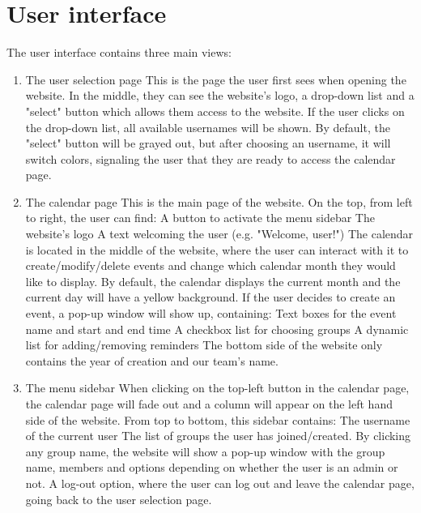 \documentclass[]{article}
\begin{document}
\section{User interface}
	The user interface contains three main views:
	\begin{enumerate}
		\item The user selection page
			\subitem This is the page the user first sees when opening the website.
			\subitem In the middle, they can see the website's logo, a drop-down list and a "select" button which allows them access to the website.
			\subitem If the user clicks on the drop-down list, all available usernames will be shown.
			\subitem By default, the "select" button will be grayed out, but after choosing an username, it will switch colors, signaling the user that they are ready to access the calendar page.
		\item The calendar page
			\subitem This is the main page of the website.
			\subitem On the top, from left to right, the user can find:
				\subsubitem A button to activate the menu sidebar
				\subsubitem The website's logo
				\subsubitem A text welcoming the user (e.g. "Welcome, user!")
			\subitem The calendar is located in the middle of the website, where the user can interact with it to create/modify/delete events and change which calendar month they would like to display.
			\subitem By default, the calendar displays the current month and the current day will have a yellow background.
			\subitem If the user decides to create an event, a pop-up window will show up, containing:
				\subsubitem Text boxes for the event name and start and end time
				\subsubitem A checkbox list for choosing groups
				\subsubitem A dynamic list for adding/removing reminders
			\subitem The bottom side of the website only contains the year of creation and our team's name.
		\item The menu sidebar
			\subitem When clicking on the top-left button in the calendar page, the calendar page will fade out and a column will appear on the left hand side of the website.
			\subitem From top to bottom, this sidebar contains:
				\subsubitem The username of the current user
				\subsubitem The list of groups the user has joined/created. By clicking any group name, the website will show a pop-up window with the group name, members and options depending on whether the user is an admin or not.
				\subsubitem A log-out option, where the user can log out and leave the calendar page, going back to the user selection page.
	\end{enumerate}
\end{document}
